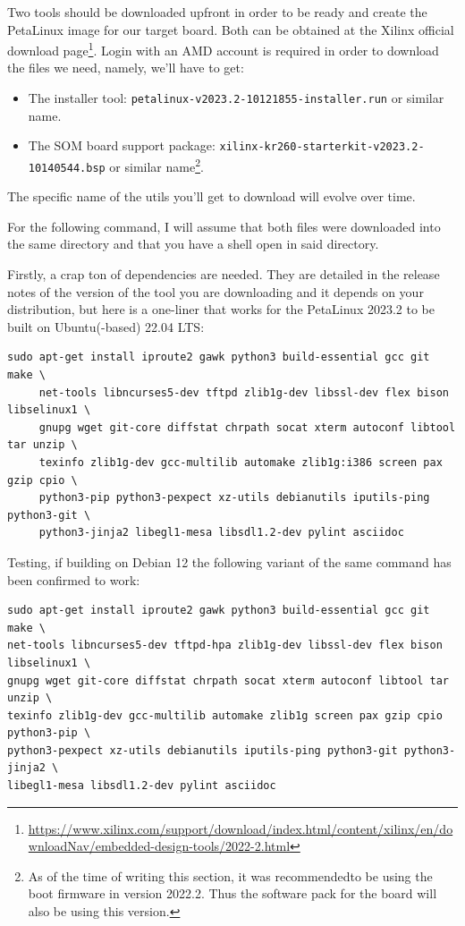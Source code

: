 \documentclass[10pt]{article}
\begin{document}
Two tools should be downloaded upfront in order to be ready and create the
PetaLinux image for our target board. Both can be obtained at the Xilinx
official download page\footnote{\url{https://www.xilinx.com/support/download/index.html/content/xilinx/en/downloadNav/embedded-design-tools/2022-2.html}\label{org06d8de7}}. Login with an AMD account is required in order to
download the files we need, namely, we'll have to get:
\begin{itemize}
\item The installer tool: \texttt{petalinux-v2023.2-10121855-installer.run} or similar name.
\item The SOM board support package: \texttt{xilinx-kr260-starterkit-v2023.2-10140544.bsp} or similar name\footnote{As of the time of writing this section, it was recommended\footnotemark to be
using the boot firmware in version 2022.2. Thus the software pack for the board
will also be using this version.\label{org15702c5}}.
\end{itemize}
The specific name of the utils you'll get to download will evolve over time.

For the following command, I will assume that both files were downloaded into
the same directory and that you have a shell open in said directory.

Firstly, a crap ton of dependencies are needed. They are detailed in the
release notes of the version of the tool you are downloading and it depends on
your distribution, but here is a one-liner that works for the PetaLinux 2023.2
to be built on Ubuntu(-based) 22.04 LTS:
\begin{verbatim}
sudo apt-get install iproute2 gawk python3 build-essential gcc git make \
     net-tools libncurses5-dev tftpd zlib1g-dev libssl-dev flex bison libselinux1 \
     gnupg wget git-core diffstat chrpath socat xterm autoconf libtool tar unzip \
     texinfo zlib1g-dev gcc-multilib automake zlib1g:i386 screen pax gzip cpio \
     python3-pip python3-pexpect xz-utils debianutils iputils-ping python3-git \
     python3-jinja2 libegl1-mesa libsdl1.2-dev pylint asciidoc
\end{verbatim}

Testing, if building on Debian 12 the following variant of the same command has been confirmed to work:
\begin{verbatim}
sudo apt-get install iproute2 gawk python3 build-essential gcc git make \
net-tools libncurses5-dev tftpd-hpa zlib1g-dev libssl-dev flex bison libselinux1 \
gnupg wget git-core diffstat chrpath socat xterm autoconf libtool tar unzip \
texinfo zlib1g-dev gcc-multilib automake zlib1g screen pax gzip cpio python3-pip \
python3-pexpect xz-utils debianutils iputils-ping python3-git python3-jinja2 \
libegl1-mesa libsdl1.2-dev pylint asciidoc
\end{verbatim}
\end{document}
